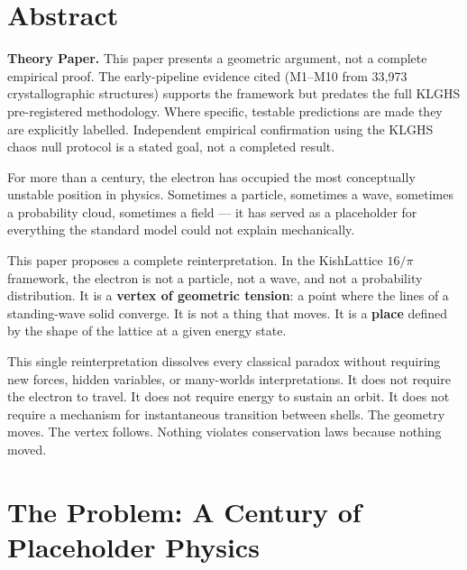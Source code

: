 \documentclass[11pt, letterpaper, openany]{book}
\begin{document}
\tableofcontents
\clearpage

\chapter*{Abstract}

\begin{warningbox}
\textbf{Theory Paper.} This paper presents a geometric argument, not a
complete empirical proof. The early-pipeline evidence cited (M1–M10 from
33,973 crystallographic structures) supports the framework but predates the
full KLGHS pre-registered methodology. Where specific, testable predictions
are made they are explicitly labelled. Independent empirical confirmation
using the KLGHS chaos null protocol is a stated goal, not a completed result.
\end{warningbox}

\bigskip

For more than a century, the electron has occupied the most conceptually
unstable position in physics. Sometimes a particle, sometimes a wave,
sometimes a probability cloud, sometimes a field — it has served as a
placeholder for everything the standard model could not explain mechanically.

This paper proposes a complete reinterpretation. In the KishLattice
$16/\pi$ framework, the electron is not a particle, not a wave, and not
a probability distribution. It is a \textbf{vertex of geometric tension}:
a point where the lines of a standing-wave solid converge. It is not a
thing that moves. It is a \textbf{place} defined by the shape of the
lattice at a given energy state.

This single reinterpretation dissolves every classical paradox without
requiring new forces, hidden variables, or many-worlds interpretations.
It does not require the electron to travel. It does not require energy to
sustain an orbit. It does not require a mechanism for instantaneous
transition between shells. The geometry moves. The vertex follows.
Nothing violates conservation laws because nothing moved.

\clearpage

\chapter{The Problem: A Century of Placeholder Physics}
\end{document}
